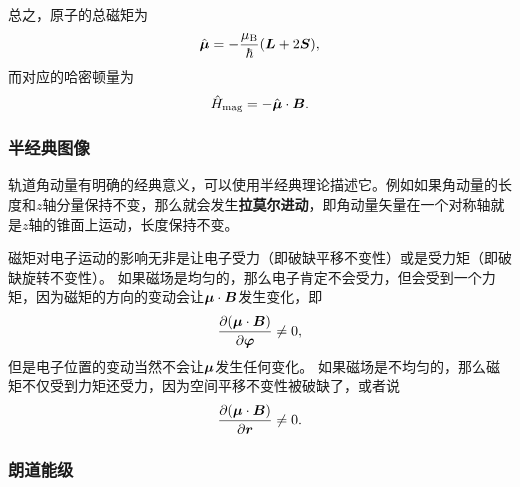 \documentclass[UTF8, a4paper]{ctexart}
\begin{document}
总之，原子的总磁矩为
\begin{equation}
    \hat{\vb*{\mu}} = - \frac{\mu_\text{B}}{\hbar} (\vb*{L} + 2\vb*{S}),
\end{equation}
而对应的哈密顿量为
\begin{equation}
    \hat{H}_\text{mag} = - \hat{\vb*{\mu}} \cdot \vb*{B}.
    \label{eq:magnetic-hamiltonian}
\end{equation}

\subsubsection{半经典图像}

轨道角动量有明确的经典意义，可以使用半经典理论描述它。例如如果角动量的长度和$z$轴分量保持不变，那么就会发生\textbf{拉莫尔进动}，即角动量矢量在一个对称轴就是$z$轴的锥面上运动，长度保持不变。

磁矩对电子运动的影响无非是让电子受力（即破缺平移不变性）或是受力矩（即破缺旋转不变性）。
如果磁场是均匀的，那么电子肯定不会受力，但会受到一个力矩，因为磁矩的方向的变动会让$\vb*{\mu} \cdot \vb*{B}$发生变化，即
\[
    \pdv{(\vb*{\mu} \cdot \vb*{B})}{\vb*{\varphi}} \neq 0,
\]
但是电子位置的变动当然不会让$\vb*{\mu}$发生任何变化。
如果磁场是不均匀的，那么磁矩不仅受到力矩还受力，因为空间平移不变性被破缺了，或者说
\[
    \pdv{(\vb*{\mu} \cdot \vb*{B})}{\vb*{r}} \neq 0.
\]

\subsubsection{朗道能级}
\end{document}
